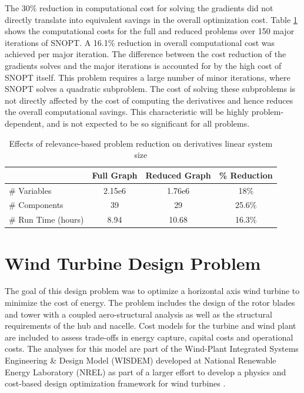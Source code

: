 \documentclass[]{aiaa-tc} %
\begin{document}
            The 30\% reduction in computational cost for solving the gradients did not directly translate into 
            equivalent savings in the overall optimization cost. Table \ref{tab:cadre-relevance-reduction}
            shows the computational costs for the full and reduced problems over 150 major iterations of SNOPT. 
            A 16.1\% reduction in overall computational cost was achieved per major iteration. The difference between 
            the cost reduction of the gradients solves and the major iterations is accounted for by the high cost of 
            SNOPT itself. This problem requires a large number of minor iterations, where SNOPT solves a quadratic subproblem. 
            The cost of solving these subproblems is not directly affected by the cost of computing the derivatives and hence
            reduces the overall computational savings. This characteristic will be highly problem-dependent, and is not expected 
            to be so significant for all problems. 

            \begin{table}
                \centering
                \caption{Effects of relevance-based problem reduction on derivatives linear system size}
                \begin{tabular}{l c c c}
                    \hline
                                 & Full Graph & Reduced Graph & \% Reduction\\
                    \hline
                    \# Variables  & 2.15e6 & 1.76e6 & 18\%\\ \hline
                    \# Components & 39 & 29 & 25.6\%\\ \hline
                    \# Run Time (hours) & 8.94 & 10.68 & 16.3\%\\ 
                    \hline
                \end{tabular}   
                \label{tab:cadre-relevance-reduction}
            \end{table}

           


  \section{Wind Turbine Design Problem}

    The goal of this design problem was to optimize a horizontal axis wind turbine to minimize the cost of energy. 
    The problem includes the design of the rotor blades and tower with a coupled aero-structural analysis as well as 
    the structural requirements of the hub and nacelle.  Cost models for the turbine and wind plant are included 
    to assess trade-offs in energy capture, capital costs and operational costs.  The analyses for this model are 
    part of the Wind-Plant Integrated Systems Engineering \& Design Model (WISDEM) developed at National Renewable 
    Energy Laboratory (NREL) as part of a larger effort to develop a physics and cost-based design optimization 
    framework for wind turbines  \cite{Dykes2014a,Ning2013a,Ning2014,Ning2014d}.
\end{document}
